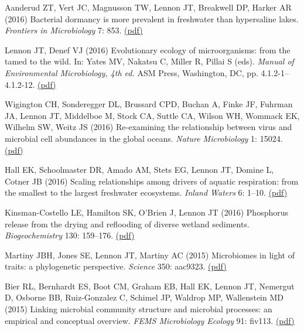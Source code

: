 \documentclass[11pt]{article}
\begin{document}
\begin{etaremune}
\item Aanderud ZT, Vert JC, Magnusson TW, Lennon JT, Breakwell DP, Harker AR (2016) Bacterial dormancy is more prevalent in freshwater than hypersaline lakes. \textit{Frontiers in Microbiology} 7: 853. \href{https://lennonlab.github.io/assets/publications/Aanderud_etal_2016.pdf}{(pdf)}

\item Lennon JT, Denef VJ (2016) Evolutionary ecology of microorganisms: from the tamed to the wild. In: Yates MV, Nakatsu C, Miller R, Pillai S (eds). \textit{Manual of Environmental Microbiology, 4th ed.} ASM Press, Washington, DC, pp. 4.1.2-1–4.1.2-12. \href{https://lennonlab.github.io/assets/publications/Lennon_Denef_2015.pdf}{(pdf)}

\item Wigington CH, Sonderegger DL, Brussard CPD, Buchan A, Finke JF, Fuhrman JA, Lennon JT, Middelboe M, Stock CA, Suttle CA, Wilson WH, Wommack EK, Wilhelm SW, Weitz JS (2016) Re-examining the relationship between virus and microbial cell abundances in the global oceans. \textit{Nature Microbiology} 1: 15024. \href{https://lennonlab.github.io/assets/publications/Wiggington_etal_2016.pdf}{(pdf)}

\item Hall EK, Schoolmaster DR, Amado AM, Stets EG, Lennon JT, Domine L, Cotner JB (2016) Scaling relationships among drivers of aquatic respiration: from the smallest to the largest freshwater ecosystems. \textit{Inland Waters} 6: 1–10. \href{https://lennonlab.github.io/assets/publications/Hall_etal_2016.pdf}{(pdf)}

\item Kinsman-Costello LE, Hamilton SK, O'Brien J, Lennon JT (2016) Phosphorus release from the drying and reflooding of diverse wetland sediments. \textit{Biogeochemistry} 130: 159–176. \href{https://lennonlab.github.io/assets/publications/Kinsman-Costello_etal_2016.pdf}{(pdf)}

\item Martiny JBH, Jones SE, Lennon JT, Martiny AC (2015) Microbiomes in light of traits: a phylogenetic perspective. \textit{Science} 350: aac9323. \href{https://lennonlab.github.io/assets/publications/Martiny_etal_2015.pdf}{(pdf)}

\item Bier RL, Bernhardt ES, Boot CM, Graham EB, Hall EK, Lennon JT, Nemergut D, Osborne BB, Ruiz-Gonzalez C, Schimel JP, Waldrop MP, Wallenstein MD (2015) Linking microbial community structure and microbial processes: an empirical and conceptual overview. \textit{FEMS Microbiology Ecology} 91: fiv113. \href{https://lennonlab.github.io/assets/publications/Bier_etal_2015.pdf}{(pdf)}


\end{etaremune}
\end{document}
